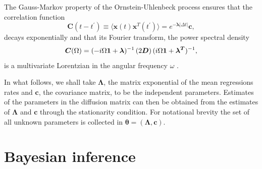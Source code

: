 \documentclass[english,aps, twocolumn, pre,superscriptaddress, notitlepage]{revtex4-1}
\begin{document}
The Gauss-Markov property of the Ornstein-Uhlenbeck process ensures
that the correlation function
\begin{equation}
\boldsymbol{C}(t-t^{\prime})\equiv\langle\boldsymbol{x}(t)\boldsymbol{x}^{T}(t^{\prime})\rangle=e^{-\boldsymbol{\lambda}|\Delta t|}\boldsymbol{c},\mathbf{}\label{eq:autocorr}
\end{equation}
decays exponentially and that its Fourier transform, the power spectral
density
\begin{equation}
\boldsymbol{C}(\Omega)=(\text{\textminus}i\Omega\boldsymbol{1}+\boldsymbol{\lambda})^{-1}\left(2\boldsymbol{D}\right)(i\Omega\boldsymbol{1}+\boldsymbol{\lambda^{T}})^{-1},\label{eq:spectral-density}
\end{equation}
is a multivariate Lorentzian in the angular frequency $\omega$ \cite{van1992stochastic}. 

In what follows, we shall take $\boldsymbol{\Lambda}$, the matrix
exponential of the mean regressions rates and $\boldsymbol{c}$, the
covariance matrix, to be the independent parameters. Estimates of
the parameters in the diffusion matrix can then be obtained from the
estimates of $\boldsymbol{\Lambda}$ and $\boldsymbol{c}$ through
the stationarity condition. For notational brevity the set of all
unknown parameters is collected in $\boldsymbol{\theta}=(\boldsymbol{\Lambda},\boldsymbol{c})$. 

\section{Bayesian inference\label{sec:Bayesian-inference}}
\end{document}
